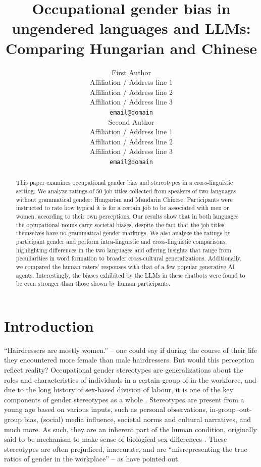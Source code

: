 \documentclass[11pt]{article}
\title{Occupational gender bias in ungendered languages and LLMs: Comparing Hungarian and Chinese}
\author{First Author \\
  Affiliation / Address line 1 \\
  Affiliation / Address line 2 \\
  Affiliation / Address line 3 \\
  \texttt{email@domain} \\\And
  Second Author \\
  Affiliation / Address line 1 \\
  Affiliation / Address line 2 \\
  Affiliation / Address line 3 \\
  \texttt{email@domain} \\}
\begin{document}
\maketitle

\begin{abstract}
This paper examines occupational gender bias and stereotypes in a cross-linguistic setting. We analyze ratings of 50 job titles collected from speakers of two languages without grammatical gender: Hungarian and Mandarin Chinese. Participants were instructed to rate how typical it is for a certain job to be associated with men or women, according to their own perceptions.
Our results show that in both languages the occupational nouns carry societal biases, despite the fact that the job titles themselves have no grammatical gender markings. We also analyze the ratings by participant gender and perform intra-linguistic and cross-linguistic comparisons, highlighting differences in the two languages and offering insights that range from peculiarities in word formation to broader cross-cultural generalizations.
Additionally, we compared the human raters' responses with that of a few popular generative AI agents. Interestingly, the biases exhibited by the LLMs in these chatbots were found to be even stronger than those shown by human participants.

\end{abstract}

\section{Introduction}

``Hairdressers are mostly women.'' -- one could say if during the course of their life they encountered more female than male hairdressers. But would this perception reflect reality? 
Occupational gender stereotypes are generalizations about the roles and characteristics of individuals in a certain group of in the workforce, and due to the long history of sex-based division of labour, it is one of the key components of gender stereotypes as a whole \citep{deaux_1984_structure}. Stereotypes are present from a young age \citep{canessapollard_2022_development} based on various inputs, such as personal observations, in-group--out-group bias, (social) media influence, societal norms and cultural narratives, and much more. As such, they are an inherent part of the human condition, originally said to be mechanism to make sense of biological sex differences \citep{levanon_2016_persistence}. These stereotypes are often prejudiced, inaccurate, and are ``misrepresenting the true ratios of gender in the workplace'' \citep{garnham_2015_true,gygax_2016_what} -- as \citet{kaukonen_2025_gender} have pointed out.
\end{document}
